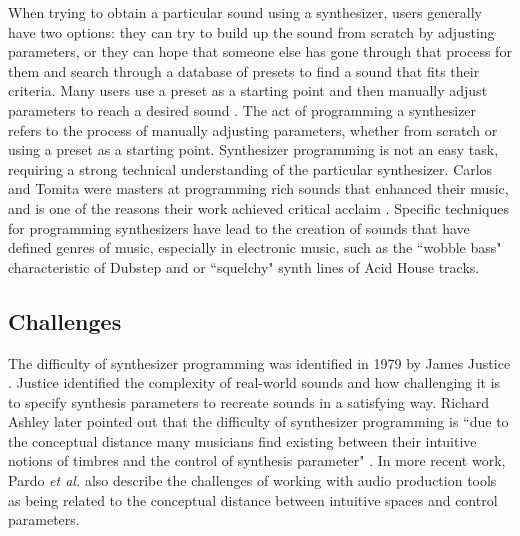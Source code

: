 When trying to obtain a particular sound using a synthesizer, users generally have two options: they can try to build up the sound from scratch by adjusting parameters, or they can hope that someone else has gone through that process for them and search through a database of presets to find a sound that fits their criteria. Many users use a preset as a starting point and then manually adjust parameters to reach a desired sound \cite{krekovic2019insights}. The act of programming a synthesizer refers to the process of manually adjusting parameters, whether from scratch or using a preset as a starting point. Synthesizer programming is not an easy task, requiring a strong technical understanding of the particular synthesizer. Carlos and Tomita were masters at programming rich sounds that enhanced their music, and is one of the reasons their work achieved critical acclaim \cite{jenkins2019analog}. Specific techniques for programming synthesizers have lead to the creation of sounds that have defined genres of music, especially in electronic music, such as the ``wobble bass" characteristic of Dubstep and or ``squelchy" synth lines of Acid House tracks. 



\subsection{Challenges}
The difficulty of synthesizer programming was identified in 1979 by James Justice \cite{justice1979analytic}. Justice identified the complexity of real-world sounds and how challenging it is to specify synthesis parameters to recreate sounds in a satisfying way. Richard Ashley later pointed out that the difficulty of synthesizer programming is ``due to the conceptual distance many musicians find existing between their intuitive notions of timbres and the control of synthesis parameter" \cite{ashley1986knowledge}. In more recent work, Pardo \textit{et al.} also describe the challenges of working with audio production tools as being related to the conceptual distance between intuitive spaces and control parameters. 

